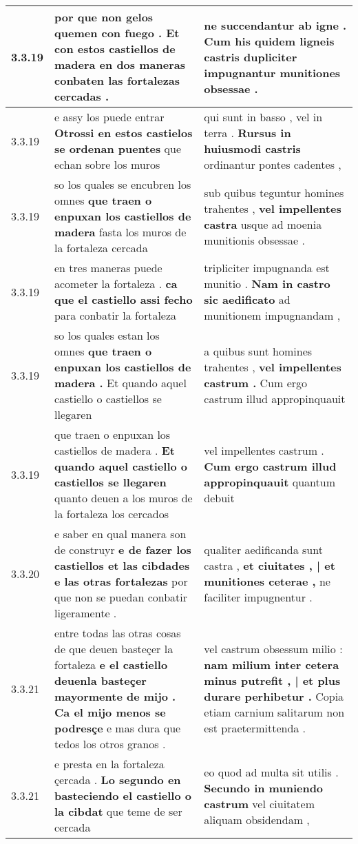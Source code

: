 \begin{tabular}{|p{1cm}|p{6.5cm}|p{6.5cm}|}
3.3.19 & por que non gelos quemen con fuego . \textbf{ Et con estos castiellos de madera } en dos maneras conbaten las fortalezas cercadas . & ne succendantur ab igne . \textbf{ Cum his quidem ligneis castris } dupliciter impugnantur munitiones obsessae . \\\hline
3.3.19 & e assy los puede entrar \textbf{ Otrossi en estos castielos se ordenan puentes } que echan sobre los muros & qui sunt in basso , vel in terra . \textbf{ Rursus in huiusmodi castris } ordinantur pontes cadentes , \\\hline
3.3.19 & so los quales se encubren los omnes \textbf{ que traen o enpuxan los castiellos de madera } fasta los muros de la fortaleza cercada & sub quibus teguntur homines trahentes , \textbf{ vel impellentes castra } usque ad moenia munitionis obsessae . \\\hline
3.3.19 & en tres maneras puede acometer la fortaleza . \textbf{ ca que el castiello assi fecho } para conbatir la fortaleza & tripliciter impugnanda est munitio . \textbf{ Nam in castro sic aedificato } ad munitionem impugnandam , \\\hline
3.3.19 & so los quales estan los omnes \textbf{ que traen o enpuxan los castiellos de madera . } Et quando aquel castiello o castiellos se llegaren & a quibus sunt homines trahentes , \textbf{ vel impellentes castrum . } Cum ergo castrum illud appropinquauit \\\hline
3.3.19 & que traen o enpuxan los castiellos de madera . \textbf{ Et quando aquel castiello o castiellos se llegaren } quanto deuen a los muros de la fortaleza los cercados & vel impellentes castrum . \textbf{ Cum ergo castrum illud appropinquauit } quantum debuit \\\hline
3.3.20 & e saber en qual manera son de construyr \textbf{ e de fazer los castiellos et las cibdades e las otras fortalezas } por que non se puedan conbatir ligeramente . & qualiter aedificanda sunt castra , \textbf{ et ciuitates , | et munitiones ceterae , } ne faciliter impugnentur . \\\hline
3.3.21 & entre todas las otras cosas de que deuen basteçer la fortaleza \textbf{ e el castiello deuenla basteçer mayormente de mijo . Ca el mijo menos se podresçe } e mas dura que tedos los otros granos . & vel castrum obsessum milio : \textbf{ nam milium inter cetera minus putrefit , | et plus durare perhibetur . } Copia etiam carnium salitarum non est praetermittenda . \\\hline
3.3.21 & e presta en la fortaleza çercada . \textbf{ Lo segundo en basteciendo el castiello o la cibdat } que teme de ser cercada & eo quod ad multa sit utilis . \textbf{ Secundo in muniendo castrum } vel ciuitatem aliquam obsidendam , \\\hline

\end{tabular}
